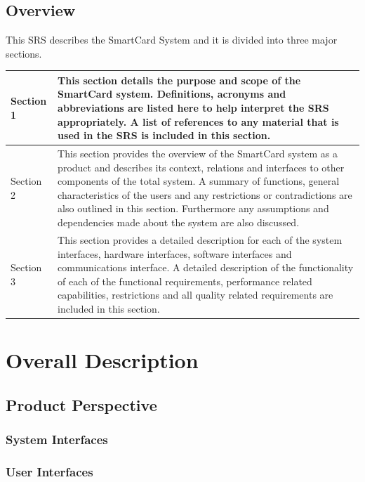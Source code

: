 \documentclass[english]{article}
\begin{document}
		\subsection{Overview}
				This SRS  describes the SmartCard System and it is divided into three major sections. \\ 
		
				\begin{tabular}{ |p{3cm}||p{11cm}|  }
				\hline
					Section 1 &  This section details the purpose and scope of the SmartCard system. Definitions, acronyms and abbreviations are listed here to help interpret the SRS appropriately. A list of references to any material that is used in the SRS is included in this section. 
					\\
				\hline
					Section 2 & This section provides the overview of the SmartCard system as a product and describes its context, relations and interfaces to other components of the total system. A summary of functions, general characteristics of the users and any restrictions or contradictions are also outlined in this section. Furthermore any assumptions and dependencies made about the system are also discussed.\\
					\hline
					Section 3 & This section provides a detailed description for each of the system interfaces, hardware interfaces, software interfaces and communications interface. A detailed description of the functionality of each of the functional requirements, performance related capabilities, restrictions and all quality related requirements are included in this section.\\
\hline
				\end{tabular}
	\newpage
	\section{Overall Description}
		
		\subsection{Product Perspective}
			
				\subsubsection{System Interfaces}
		

				\subsubsection{User Interfaces}
						
\end{document}

